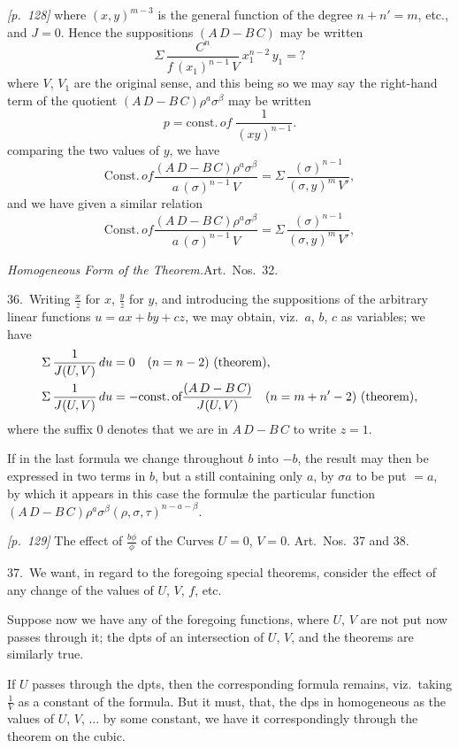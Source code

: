 \documentclass[11pt,a4paper]{book}
\begin{document}
\noindent\textit{[p.~128]} where $(x, y)^{m-3}$ is the general function of the degree $n + n' = m$, etc., and $J = 0$. Hence the suppositions $(A\,D - B\,C)$ may be written
\[
\Sigma\,\frac{C^{n}}{f\,(x_1)^{n-1}\,V}\,x_1^{n-2}\,y_1 = ?
\]
where $V$, $V_1$ are the original sense, and this being so we may say the right-hand term of the quotient $(A\,D - B\,C)\rho^a \sigma^\beta$ may be written
\[
p = \text{const.}\,of \;\frac{1}{(xy)^{n-1}}.
\]
comparing the two values of $y$, we have
\[
\text{Const.}\,of\frac{(A\,D - B\,C)\rho^a \sigma^\beta}{a\,(\sigma)^{n - 1}\,V} = \Sigma\,\frac{(\sigma)^{n - 1}}{(\sigma, y)^{m}\,V'},
\]
and we have given a similar relation
\[
\text{Const.}\,of\frac{(A\,D - B\,C)\rho^a \sigma^\beta}{a\,(\sigma)^{n - 1}\,V} = \Sigma\,\frac{(\sigma)^{n - 1}}{(\sigma, y)^{m}\,V'},
\]

\textit{Homogeneous Form of the Theorem.}\quad Art.\ Nos.~32.

36.\ Writing $\frac{x}{z}$ for $x$, $\frac{y}{z}$ for $y$, and introducing the suppositions of the arbitrary linear functions $u = ax + by + cz$, we may obtain, viz.\ $a$, $b$, $c$ as variables; we have
\begin{align*}
\Sigma\,\frac{1}{J(U, V)}\,du &= 0\quad (n = n - 2)\,\,\text{(theorem)},\\
\Sigma\,\frac{1}{J(U, V)}\,du &= -\text{const.\,of}\frac{(A\,D - B\,C)}{J(U, V)}\quad (n = m + n' - 2)\,\,\text{(theorem)},
\end{align*}
where the suffix 0 denotes that we are in $A\,D - B\,C$ to write $z = 1$.

If in the last formula we change throughout $b$ into $-b$, the result may then be expressed in two terms in $b$, but a still containing only $a$, by $\sigma a$ to be put $= a$, by which it appears in this case the formul\ae{} the particular function $(A\,D - B\,C)\rho^a \sigma^\beta (\rho, \sigma, \tau)^{n - a - \beta}$.

\bigskip\noindent\textit{[p.~129]} The effect of $\frac{b\phi}{\phi}$ of the Curves $U = 0$, $V = 0$. Art.\ Nos.~37 and 38.

37.\ We want, in regard to the foregoing special theorems, consider the effect of any change of the values of $U$, $V$, $f$, etc.

Suppose now we have any of the foregoing functions, where $U$, $V$ are not put now passes through it; the dpts of an intersection of $U$, $V$, and the theorems are similarly true.

If $U$ passes through the dpts, then the corresponding formula remains, viz.\ taking $\frac{1}{V}$ as a constant of the formula. But it must, that, the dps in homogeneous as the values of $U$, $V$, ... by some constant, we have it correspondingly through the theorem on the cubic.
\end{document}
